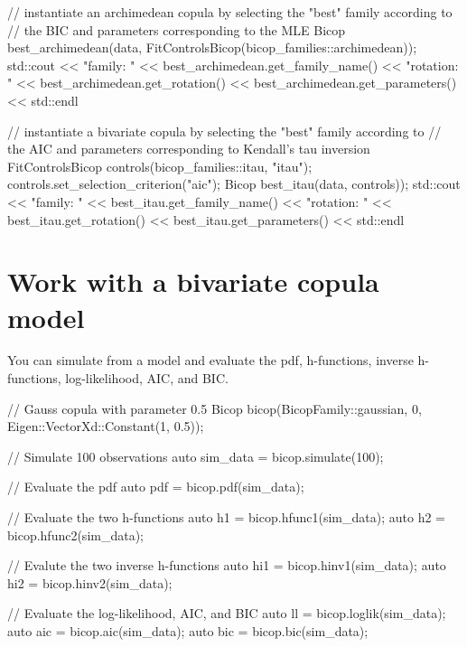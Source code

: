 \begin{DoxyCode}
\textcolor{comment}{// instantiate an archimedean copula by selecting the "best" family according to}
\textcolor{comment}{// the BIC and parameters corresponding to the MLE}
Bicop best\_archimedean(data, FitControlsBicop(bicop\_families::archimedean));
std::cout <<
       \textcolor{stringliteral}{"family: "} << best\_archimedean.get\_family\_name() <<
       \textcolor{stringliteral}{"rotation: "} <<  best\_archimedean.get\_rotation() <<
       best\_archimedean.get\_parameters() <<
       std::endl

\textcolor{comment}{// instantiate a bivariate copula by selecting the "best" family according to}
\textcolor{comment}{// the AIC and parameters corresponding to Kendall's tau inversion}
FitControlsBicop controls(bicop\_families::itau, \textcolor{stringliteral}{"itau"});
controls.set\_selection\_criterion(\textcolor{stringliteral}{"aic"});
Bicop best\_itau(data, controls));
std::cout <<
       \textcolor{stringliteral}{"family: "} << best\_itau.get\_family\_name() <<
       \textcolor{stringliteral}{"rotation: "} <<  best\_itau.get\_rotation() <<
       best\_itau.get\_parameters() <<
       std::endl
\end{DoxyCode}
\hypertarget{overview-bicop_bicop-model}{}\section{Work with a bivariate copula model}\label{overview-bicop_bicop-model}
You can simulate from a model and evaluate the pdf, h-\/functions, inverse h-\/functions, log-\/likelihood, A\+IC, and B\+IC.


\begin{DoxyCode}
\textcolor{comment}{// Gauss copula with parameter 0.5}
Bicop bicop(BicopFamily::gaussian, 0,  Eigen::VectorXd::Constant(1, 0.5));

\textcolor{comment}{// Simulate 100 observations}
\textcolor{keyword}{auto} sim\_data = bicop.simulate(100);

\textcolor{comment}{// Evaluate the pdf}
\textcolor{keyword}{auto} pdf  = bicop.pdf(sim\_data);

\textcolor{comment}{// Evaluate the two h-functions}
\textcolor{keyword}{auto} h1   = bicop.hfunc1(sim\_data);
\textcolor{keyword}{auto} h2   = bicop.hfunc2(sim\_data);

\textcolor{comment}{// Evalute the two inverse h-functions}
\textcolor{keyword}{auto} hi1  = bicop.hinv1(sim\_data);
\textcolor{keyword}{auto} hi2  = bicop.hinv2(sim\_data);

\textcolor{comment}{// Evaluate the log-likelihood, AIC, and BIC}
\textcolor{keyword}{auto} ll   = bicop.loglik(sim\_data);
\textcolor{keyword}{auto} aic  = bicop.aic(sim\_data);
\textcolor{keyword}{auto} bic  = bicop.bic(sim\_data);
\end{DoxyCode}


